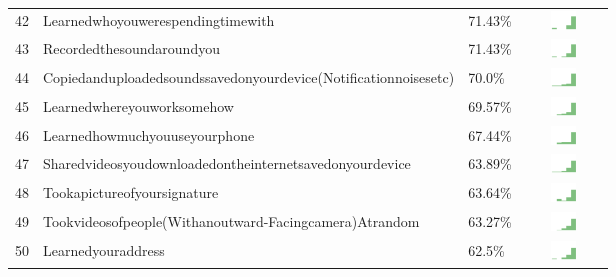 \documentclass[a4paper,12pt]{article}
\begin{document}
\begin{longtable}{| p{0.5cm} | p{7cm} | p{1cm} | c |}
42 & Learnedwhoyouwerespendingtimewith & 71.43\% & \includegraphics[width = 2cm, height = 0.5cm]{learnedwhoyouwerespendingtimewithFRIENDS} \\  
43 & Recordedthesoundaroundyou & 71.43\% & \includegraphics[width = 2cm, height = 0.5cm]{recordedthesoundaroundyouFRIENDS} \\  
44 & Copiedanduploadedsoundssavedonyourdevice(Notificationnoisesetc) & 70.0\% & \includegraphics[width = 2cm, height = 0.5cm]{copiedanduploadedsoundssavedonyourdevice(notificationnoisesetc)FRIENDS} \\  
45 & Learnedwhereyouworksomehow & 69.57\% & \includegraphics[width = 2cm, height = 0.5cm]{learnedwhereyouworksomehowFRIENDS} \\  
46 & Learnedhowmuchyouuseyourphone & 67.44\% & \includegraphics[width = 2cm, height = 0.5cm]{learnedhowmuchyouuseyourphoneFRIENDS} \\  
47 & Sharedvideosyoudownloadedontheinternetsavedonyourdevice & 63.89\% & \includegraphics[width = 2cm, height = 0.5cm]{sharedvideosyoudownloadedontheinternetsavedonyourdeviceFRIENDS} \\  
48 & Tookapictureofyoursignature & 63.64\% & \includegraphics[width = 2cm, height = 0.5cm]{tookapictureofyoursignatureFRIENDS} \\  
49 & Tookvideosofpeople(Withanoutward-Facingcamera)Atrandom & 63.27\% & \includegraphics[width = 2cm, height = 0.5cm]{tookvideosofpeople(withanoutward-facingcamera)atrandomFRIENDS} \\  
50 & Learnedyouraddress & 62.5\% & \includegraphics[width = 2cm, height = 0.5cm]{learnedyouraddressFRIENDS} \\  

\end{longtable}
\end{document}
